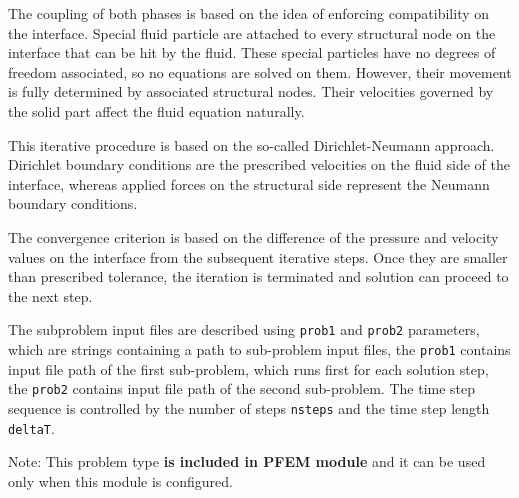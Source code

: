 \documentclass[a4paper]{article}
\newcommand{\param}[1]{\texttt{#1}} %
\begin{document}
The coupling of both phases is based on the idea of enforcing compatibility on the 
interface. Special fluid particle are attached to every structural node on the 
interface that can be hit by the fluid. These special particles have no degrees of 
freedom associated, so no equations are solved on them. However, their movement is 
fully determined by associated structural nodes. Their velocities governed by the 
solid part affect the fluid equation naturally.

This iterative procedure is based on the so-called Dirichlet-Neumann approach.
Dirichlet boundary conditions are the prescribed velocities on the fluid side of
the interface, whereas applied forces on the structural side represent the Neumann
boundary conditions.

The convergence criterion is based on the difference of the pressure and velocity
values on the interface from the subsequent iterative steps. Once they are smaller
than prescribed tolerance, the iteration is terminated and solution can proceed to
the next step.

The subproblem input files are described using
\param{prob1} and \param{prob2} parameters, which are strings
containing a path to sub-problem input files, the \param{prob1}
contains input file path of the first sub-problem, which runs first
for each solution step, the \param{prob2} contains input file path of
the second sub-problem. The time step sequence is controlled by the number of steps
\param{nsteps} and the time step length \param{deltaT}.

Note: This problem type \textbf{is included in PFEM module} and it
can be used only when this module is configured.
\end{document}
